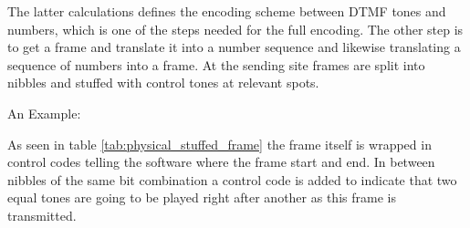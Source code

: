 	The latter calculations defines the encoding scheme between DTMF tones and numbers, which is one of the steps needed for
	the full encoding. The other step is to get a frame and translate it into a number sequence and likewise translating a
	sequence of numbers into a frame. At the sending site frames are split into nibbles and stuffed with control tones at relevant
	spots.
	
	An Example:
	

	
	As seen in table \ref{tab:physical_stuffed_frame} the frame itself is wrapped in control codes telling the software where
	the frame start and end. In between nibbles of the same bit combination a control code is added to indicate that two equal
	tones are going to be played right after another as this frame is transmitted.